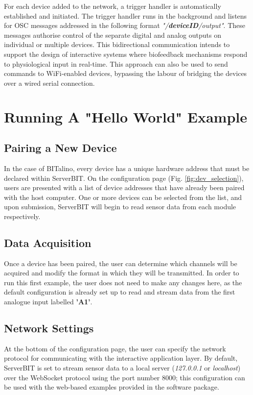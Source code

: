 For each device added to the network, a trigger handler is automatically established and initiated. The trigger handler runs in the background and listens for OSC messages addressed in the following format \textit{"/\textbf{deviceID}/output"}. These messages authorise control of the separate digital and analog outputs on individual or multiple devices. This bidirectional communication intends to support the design of interactive systems where biofeedback mechanisms respond to physiological input in real-time. This approach can also be used to send commands to WiFi-enabled devices, bypassing the labour of bridging the devices over a wired serial connection.

\section{Running A "Hello World" Example}
\subsection{Pairing a New Device} \label{Pairing}
In the case of BITalino, every device has a unique hardware address that must be declared within ServerBIT. On the configuration page (Fig. \ref{fig:dev_selection}), users are presented with a list of device addresses that have already been paired with the host computer. One or more devices can be selected from the list, and upon submission, ServerBIT will begin to read sensor data from each module respectively.

\subsection{Data Acquisition}
Once a device has been paired, the user can determine which channels will be acquired and modify the format in which they will be transmitted. In order to run this first example, the user does not need to make any changes here, as the default configuration is already set up to read and stream data from the first analogue input labelled \textbf{'A1'}.

\subsection{Network Settings}
At the bottom of the configuration page, the user can specify the network protocol for communicating with the interactive application layer. By default, ServerBIT is set to stream sensor data to a local server (\textit{127.0.0.1} or \textit{localhost}) over the WebSocket protocol using the port number 8000; this configuration can be used with the web-based examples provided in the software package.

